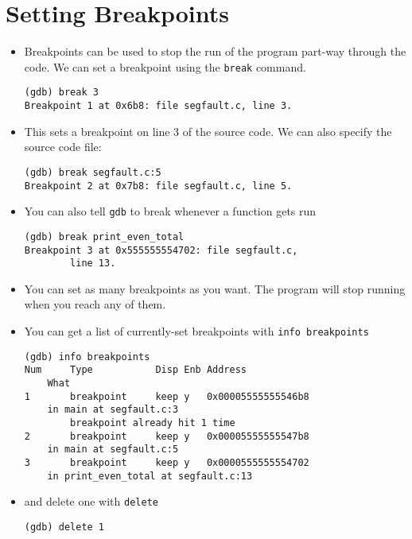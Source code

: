 \documentclass{article}
\begin{document}
\section{Setting Breakpoints}
\begin{itemize}
\item Breakpoints can be used to stop the run of the program part-way through the code.
We can set a breakpoint using the \verb!break! command.
\begin{verbatim}
(gdb) break 3
Breakpoint 1 at 0x6b8: file segfault.c, line 3.
\end{verbatim}
\item This sets a breakpoint on line 3 of the source code. We can also specify the source code file:
\begin{verbatim}
(gdb) break segfault.c:5
Breakpoint 2 at 0x7b8: file segfault.c, line 5.
\end{verbatim}
\item You can also tell \verb!gdb! to break whenever a function gets run
\begin{verbatim}
(gdb) break print_even_total 
Breakpoint 3 at 0x555555554702: file segfault.c,
        line 13.
\end{verbatim}
\item You can set as many breakpoints as you want. The program will stop running when you reach any of them.
\end{itemize}



\begin{itemize}
\item You can get a list of currently-set breakpoints with \verb!info breakpoints!
\begin{verbatim}
(gdb) info breakpoints
Num     Type           Disp Enb Address            
    What
1       breakpoint     keep y   0x00005555555546b8
    in main at segfault.c:3
        breakpoint already hit 1 time
2       breakpoint     keep y   0x00005555555547b8
    in main at segfault.c:5
3       breakpoint     keep y   0x0000555555554702
    in print_even_total at segfault.c:13
\end{verbatim}
\item and delete one with \verb!delete!
\begin{verbatim}
(gdb) delete 1
\end{verbatim}
\end{itemize}
\end{document}
